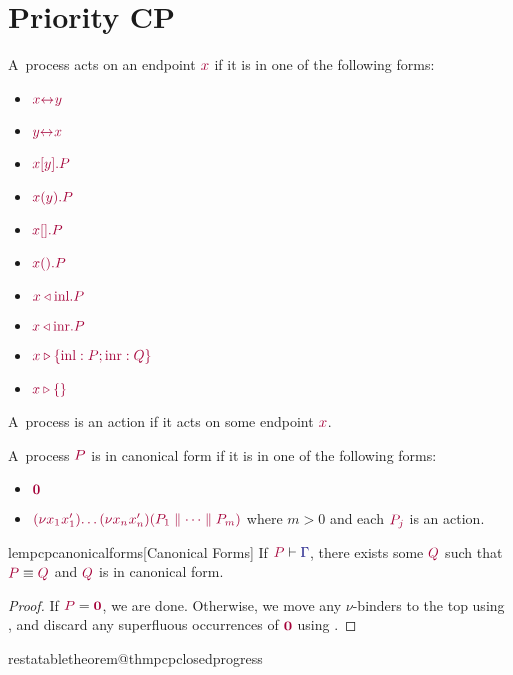 \documentclass[citecolor=red,linkcolor=blue,runningheads]{llncs}
\makeatletter
\newcommand{\restatetheorem}[1]{%
  \begingroup
  \renewcommand{\thetheorem}{\ref{#1}}%
  \expandafter\expandafter\expandafter\theorem
  \csname restatabletheorem@#1\endcsname
  \endtheorem
  \endgroup
}
\newcommand{\tm}[1]{\ensuremath{{\color[HTML]{a40038}#1}}}
\newcommand{\ty}[1]{\ensuremath{{\color[HTML]{00007a}#1}}}
\providecommand{\res}[4][]{\ensuremath{(\nu{#2}^{#1}{#3}){#4}}}
\providecommand{\halt}[0]{\ensuremath{\mathbf{0}}}
\providecommand{\link}[3][]{\lablink[#1]{#2}{#3}}
\providecommand{\send}[3]{\ensuremath{\labsend{#1}{#2}.#3}}
\providecommand{\recv}[3]{\ensuremath{\labrecv{#1}{#2}.#3}}
\providecommand{\close}[2]{\ensuremath{\labclose{#1}.#2}}
\providecommand{\wait}[2]{\ensuremath{\labwait{#1}.#2}}
\providecommand{\inl}[2]{\ensuremath{\labselinl{#1}.{#2}}}
\providecommand{\inr}[2]{\ensuremath{\labselinr{#1}.{#2}}}
\providecommand{\offer}[3]{\ensuremath{{#1}\triangleright\{\text{inl}:#2;\text{inr}:#3\}}}
\providecommand{\absurd}[1]{\ensuremath{{#1}\triangleright\{\}}}
\providecommand{\seq}[2]{\ensuremath{\tm{#1}\vdash{#2}}}
\providecommand{\lablink}[3][]{\ensuremath{{#2}{\leftrightarrow}^{#1}{#3}}}
\providecommand{\labsend}[2]{\ensuremath{#1[#2]}}
\providecommand{\labrecv}[2]{\ensuremath{#1(#2)}}
\providecommand{\labclose}[1]{\labsend{#1}{}}
\providecommand{\labwait}[1]{\labrecv{#1}{}}
\providecommand{\labselinl}[1]{\ensuremath{{#1}\triangleleft\text{inl}}}
\providecommand{\labselinr}[1]{\ensuremath{{#1}\triangleleft\text{inr}}}
\providecommand{\labinl}[0]{\ensuremath{\mathbf{inl}}}
\providecommand{\labinr}[0]{\ensuremath{\mathbf{inr}}}
\providecommand{\inl}[1]{\ensuremath{\labinl\;#1}}
\providecommand{\inr}[1]{\ensuremath{\labinr\;#1}}
\providecommand{\absurd}[1]{\ensuremath{\mathbf{absurd}\;#1}}
\providecommand{\link}[0]{\ensuremath{\mathbf{link}}}
\providecommand{\halt}[0]{\ensuremath{\mathbf{halt}}}
\providecommand{\send}[0]{\ensuremath{\mathbf{send}}}
\providecommand{\recv}[0]{\ensuremath{\mathbf{recv}}}
\providecommand{\wait}[0]{\ensuremath{\mathbf{wait}}}
\providecommand{\close}[0]{\ensuremath{\mathbf{close}}}
\providecommand{\offer}[5]{\ensuremath{\mathbf{offer}\;#1\;\{\inl{#2}\mapsto{#3};\inr{#4}\mapsto{#5}\}}}
\providecommand{\res}[3]{\ensuremath{(\nu#1#2)#3}}
\makeatother
\begin{document}
\section{Priority CP}
{

  

  \begin{definition}[Actions]
    A~process acts on an endpoint $\tm{x}$ if it is in one of the following forms:
    \begin{multicols}{3}
      \begin{itemize}[noitemsep,topsep=0pt,parsep=0pt,partopsep=0pt]
      \item $\tm{\link{x}{y}}$ 
      \item $\tm{\link{y}{x}}$
      \item $\tm{\send{x}{y}{P}}$
      \item $\tm{\recv{x}{y}{P}}$
      \item $\tm{\close{x}{P}}$
      \item $\tm{\wait{x}{P}}$
      \item $\tm{\inl{x}{P}}$
      \item $\tm{\inr{x}{P}}$
      \item $\tm{\offer{x}{P}{Q}}$
      \item $\tm{\absurd{x}}$
      \end{itemize}
    \end{multicols}
    \noindent
    A~process is an action if it acts on some endpoint $\tm{x}$.
  \end{definition}
  
  \begin{definition}
    \label{def:pcp-canonical-forms}
    A~process $\tm{P}$ is in canonical form if it is in one of the following forms:
    \begin{itemize}[noitemsep,topsep=0pt,parsep=0pt,partopsep=0pt]
    \item
      $\tm{\halt}$
    \item
      $\tm{\res{x_1}{x'_1}{\dots\res{x_n}{x'_n}{(P_1 \parallel\dots\parallel P_m)}}}$
      where $m>0$ and each $\tm{P_j}$ is an action.
    \end{itemize}
  \end{definition}
  
  \begin{restatablelemma}{lempcpcanonicalforms}[Canonical Forms]
    \label{lem:pcp-canonical-forms}
    If $\seq{P}{\ty{\Gamma}}$, there exists some $\tm{Q}$ such that $\tm{P}\equiv\tm{Q}$ and $\tm{Q}$ is in canonical form.
  \end{restatablelemma}
  \begin{proof}
    If $\tm{P}=\tm{\halt}$, we are done. Otherwise, we move any $\nu$-binders to the top using , and discard any superfluous occurrences of $\tm{\halt}$ using .
  \end{proof}

  \restatetheorem{thmpcpclosedprogress}
  
}
\end{document}
